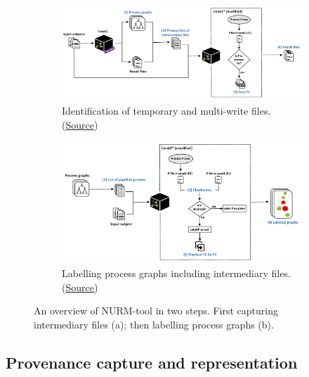 \documentclass[a4paper,num-refs]{oup-contemporary}
\begin{document}
\begin{figure}
  \centering
  \begin{subfigure}{\columnwidth}
    \centering
    \includegraphics[width=1\columnwidth]{images/fig1-a}
    \caption{Identification of temporary and multi-write files.
    (\href{https://docs.google.com/drawings/d/1rsbFwPjNPNMRhXUl4RSK3G0OaiJC7K-buiHN0hPD8eQ/edit?usp=sharing}{Source})}
    \label{fig:overview-capturing}
  \end{subfigure}
   \begin{subfigure}{\columnwidth}
    \centering
     \includegraphics[width=1\columnwidth]{images/fig1-b}
     \caption{Labelling process graphs including intermediary files.
     (\href{https://docs.google.com/drawings/d/1yblYuKWAD18aJe5JxBu2h1EysyoQA3YrsQj-1T3s0l8/edit?usp=sharing}{Source})}
     \label{fig:overview-labelling}
   \end{subfigure}
   \caption{An overview of NURM-tool in two steps. First capturing intermediary files (a); then
            labelling process graphs (b).}
   \label{fig:overview}
  \end{figure}

\subsection{Provenance capture and representation}
\end{document}
